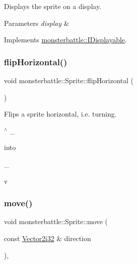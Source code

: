 Displays the sprite on a display. 


\begin{DoxyParams}{Parameters}
{\em display} & \\
\hline
\end{DoxyParams}


Implements \hyperlink{structmonsterbattle_1_1IDisplayable_a2e7b5b2259cd0f00d65a99752072e66e}{monsterbattle\+::\+I\+Displayable}.

\mbox{\label{classmonsterbattle_1_1Sprite_acbe4b309f8cac41f2b29cfcf29227006}} 
\subsubsection{\texorpdfstring{flip\+Horizontal()}{flipHorizontal()}}
{\footnotesize\ttfamily void monsterbattle\+::\+Sprite\+::flip\+Horizontal (\begin{DoxyParamCaption}{ }\end{DoxyParamCaption})}



Flips a sprite horizontal, i.\+e. turning. 

$^\wedge$ \+\_\+

into

\+\_\+

v \mbox{\label{classmonsterbattle_1_1Sprite_a4eae41525289f126bc83b326c3be7907}} 
\subsubsection{\texorpdfstring{move()}{move()}}
{\footnotesize\ttfamily void monsterbattle\+::\+Sprite\+::move (\begin{DoxyParamCaption}\item[{const \hyperlink{structmonsterbattle_1_1Vector}{Vector2i32} \&}]{direction }\end{DoxyParamCaption})\hspace{0.3cm}{\ttfamily [override]}, {\ttfamily [virtual]}}



